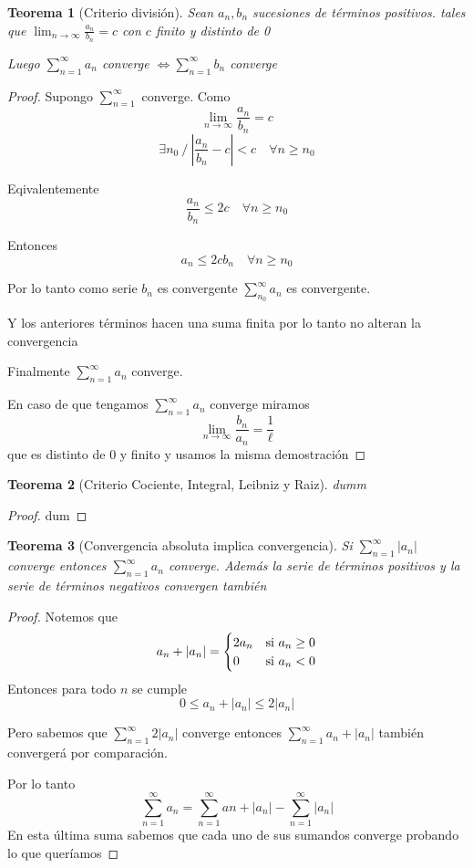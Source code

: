 \documentclass{article}
\theoremstyle{break}
\newtheorem{theorem}{Teorema}[section]
\begin{document}
\begin{theorem}[Criterio división]
	Sean $a_n,b_n$ sucesiones de términos positivos. tales que
	 $\lim_{n \rightarrow \infty }\frac{a_n}{b_n} = c$ con $c$ finito y distinto de 0
	
	 Luego $\sum_{n=1}^{\infty} a_n$ converge $\iff \sum_{n=1}^{\infty}b_n$ converge
\end{theorem}
\begin{proof}
	Supongo $\sum_{n=1}^{\infty}$ converge. Como 
	\[\lim_{n \rightarrow \infty }\frac{a_n}{b_n}=c\]
	\[ \exists n_0 \ / \ |\frac{a_n}{b_n}-c| < c \quad \forall n \geq n_0 \]

	Eqivalentemente \[  \frac{a_n}{b_n} \leq 2c \quad \forall n\geq n_0 \]

	Entonces \[ a_n \leq 2c b_n  \quad \forall n\geq n_0\]

	Por lo tanto como serie $b_n$ es convergente $\sum_{n_0}^{\infty} a_n$ es convergente.

	Y los anteriores términos hacen una suma finita por lo tanto no alteran la convergencia

	Finalmente $\sum_{n=1}^{\infty}a_n$ converge. 

	En caso de que tengamos $\sum_{n=1}^{\infty}a_n$ converge miramos 
	\[ \lim_{n \rightarrow \infty }\frac{b_n}{a_n} = \frac{1}{\ell}  \] que es distinto de 0 y finito
	y usamos la misma demostración
\end{proof}

\begin{theorem}[Criterio Cociente, Integral, Leibniz y Raiz]
	dumm
\end{theorem}
\begin{proof}
	dum
\end{proof}

\begin{theorem}[Convergencia absoluta implica convergencia]
	Si $\sum_{n=1}^{\infty}|a_n|$ converge entonces $\sum_{n=1}^{\infty}a_n$ converge. 
	Además la serie de términos positivos y la serie de términos negativos convergen también
\end{theorem}
\begin{proof}
	Notemos que
	\[   
	  a_n + |a_n| =
	  \begin{cases}
									   2a_n & \text{si $ a_n\geq 0 $} \\
									   0 & \text{si $ a_n <0 $} \\
	  \end{cases}
	\]
	Entonces para todo $n$ se cumple \[ 0\leq a_n + |a_n| \leq 2|a_n| \]

	Pero sabemos que $\sum_{n=1}^{\infty}2|a_n|$ converge entonces $\sum_{n=1}^{\infty} a_n + |a_n|$ también convergerá
	por comparación.

	Por lo tanto \[ \sum_{n=1}^{\infty} a_n = \sum_{n=1}^{\infty} an + |a_n| - \sum_{n=1}^{\infty}|a_n|\]
	En esta última suma sabemos que cada uno de sus sumandos converge probando lo que queríamos
\end{proof}
\end{document}
